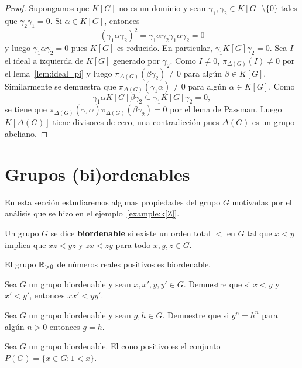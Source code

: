 \begin{proof}
	Supongamos que $K[G]$ no es un dominio y sean $\gamma_1,\gamma_2\in K[G]\setminus\{0\}$
	tales que $\gamma_2\gamma_1=0$. Si $\alpha\in K[G]$, entonces
	\[
		(\gamma_1\alpha\gamma_2)^2=\gamma_1\alpha\gamma_2\gamma_1\alpha\gamma_2=0
	\]
	y luego $\gamma_1\alpha\gamma_2=0$ pues $K[G]$ es reducido. En particular,
	$\gamma_1K[G]\gamma_2=0$. Sea $I$ el ideal a izquierda de $K[G]$ generado
	por $\gamma_2$. Como $I\ne 0$, $\pi_{\Delta(G)}(I)\ne 0$ por el lema~\ref{lem:ideal_pi}
	y luego $\pi_{\Delta(G)}(\beta\gamma_2)\ne 0$ para algún $\beta\in K[G]$. Similarmente se demuestra que
	$\pi_{\Delta(G)}(\gamma_1\alpha)\ne 0$ para algún $\alpha\in K[G]$. Como
	\[
		\gamma_1\alpha K[G]\beta\gamma_2\subseteq \gamma_1 K[G]\gamma_2=0,
	\]
	se tiene que $\pi_{\Delta(G)}(\gamma_1\alpha)\pi_{\Delta(G)}(\beta\gamma_2)=0$ por
	el lema de Passman. Luego $K[\Delta(G)]$ tiene divisores de cero, una contradicción 
	pues $\Delta(G)$ es un grupo abeliano.
\end{proof}

\section{Grupos (bi)ordenables}

En esta sección estudiaremos algunas propiedades del grupo $G$ motivadas por el
análisis que se hizo en el ejemplo~\ref{example:k[Z]}.

\begin{definition}
	Un grupo $G$ se dice \textbf{biordenable} si existe un orden total $<$ en $G$
	tal que $x<y$ implica que $xz<yz$ y $zx<zy$ para todo $x,y,z\in G$.
\end{definition}

\begin{example}
	El grupo $\mathbb{R}_{>0}$ de números reales positivos es biordenable.
\end{example}

\begin{exercise}
	Sea $G$ un grupo biordenable y sean $x,x',y,y'\in G$. Demuestre que si
	$x<y$ y $x'<y'$, entonces $xx'<yy'$.
\end{exercise}

\begin{exercise}
	Sea $G$ un grupo biordenable y sean $g,h\in G$. Demuestre que si $g^n=h^n$
	para algún $n>0$ entonces $g=h$.
\end{exercise}

\begin{definition}
	Sea $G$ un grupo biordenable. El cono positivo es el conjunto $P(G)=\{x\in
	G:1<x\}$.
\end{definition}

